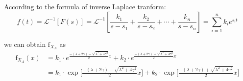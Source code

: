 \documentclass[UTF8]{article}
\begin{document}
\begin{enumerate}[a)]
        According to the formula of inverse Laplace tranform:
        \begin{equation*}
            f(t)=\mathcal{L}^{-1}[F(s)]=\mathcal{L}^{-1}[\frac{k_1}{s-s_1}+\frac{k_2}{s-s_2}+\cdots+\frac{k_n}{s-s_n}]=\sum_{i=1}^nk_ie^{s_it}
        \end{equation*}

        we can obtain $\text{f}_{X_A}$ as
        \begin{equation*}
            \begin{aligned}
                \text{f}_{X_A}(x)&=k_1\cdot e^{\frac{-(\lambda+2\gamma)-\sqrt{\lambda^2+4\gamma^2}}{2}x}+k_2\cdot e^{\frac{-(\lambda+2\gamma)+\sqrt{\lambda^2+4\gamma^2}}{2}x}\\
                &=k_1\cdot\exp\bigg[\frac{-(\lambda+2\gamma)-\sqrt{\lambda^2+4\gamma^2}}{2}x\bigg]+k_2\cdot\exp\bigg[\frac{-(\lambda+2\gamma)+\sqrt{\lambda^2+4\gamma^2}}{2}x\bigg]
            \end{aligned}
        \end{equation*}
    \end{enumerate}

    
\end{document}
